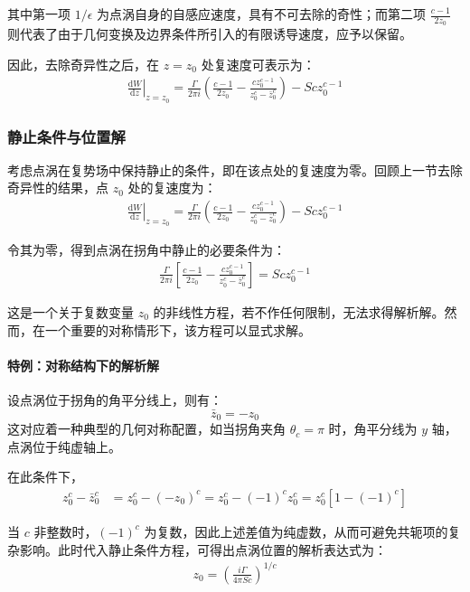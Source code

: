 其中第一项 $1/\epsilon$ 为点涡自身的自感应速度，具有不可去除的奇性；而第二项 $\frac{c-1}{2z_0}$ 则代表了由于几何变换及边界条件所引入的有限诱导速度，应予以保留。

因此，去除奇异性之后，在 $z=z_0$ 处复速度可表示为：
\begin{align}
    \left.\frac{\mathrm{d}W}{\mathrm{d}z}\right|_{z=z_{0}} = \frac{\Gamma}{2\pi i} \left( \frac{c-1}{2z_0} - \frac{cz_0^{c-1}}{z_0^{c} - \bar{z}_0^{c}} \right) - Scz_0^{c-1}
\end{align}

\subsubsection{静止条件与位置解}

考虑点涡在复势场中保持静止的条件，即在该点处的复速度为零。回顾上一节去除奇异性的结果，点 $z_0$ 处的复速度为：
\begin{align}
    \left.\frac{\mathrm{d}W}{\mathrm{d}z}\right|_{z=z_0} = \frac{\Gamma}{2\pi i} \left( \frac{c-1}{2z_0} - \frac{c z_0^{c-1}}{z_0^c - \bar{z}_0^c} \right) - S c z_0^{c-1}
\end{align}

令其为零，得到点涡在拐角中静止的必要条件为：
\begin{align}
    \boxed{
    \frac{\Gamma}{2\pi i} \left[ \frac{c-1}{2z_0} - \frac{c z_0^{c-1}}{z_0^c - \bar{z}_0^c} \right] = S c z_0^{c-1}
    }
\end{align}

这是一个关于复数变量 $z_0$ 的非线性方程，若不作任何限制，无法求得解析解。然而，在一个重要的对称情形下，该方程可以显式求解。

\paragraph{特例：对称结构下的解析解}

设点涡位于拐角的角平分线上，则有：
\[
\boxed{ \bar{z}_0 = -z_0 }
\]
这对应着一种典型的几何对称配置，如当拐角夹角 $\theta_c = \pi$ 时，角平分线为 $y$ 轴，点涡位于纯虚轴上。

在此条件下，
\begin{align*}
    z_0^c - \bar{z}_0^c &= z_0^c - (-z_0)^c = z_0^c - (-1)^c z_0^c = z_0^c[1 - (-1)^c]
\end{align*}

当 $c$ 非整数时，$(-1)^c$ 为复数，因此上述差值为纯虚数，从而可避免共轭项的复杂影响。此时代入静止条件方程，可得出点涡位置的解析表达式为：
\begin{align}
    \boxed{
    z_0 = \left( \frac{i\Gamma}{4\pi S c} \right)^{1/c}
    }
\end{align}

